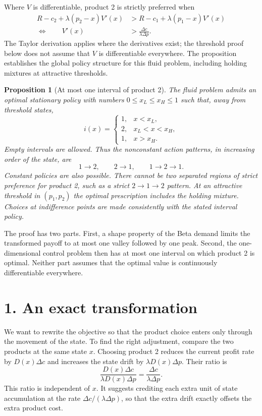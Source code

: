 \documentclass[11pt]{article}
\newtheorem{proposition}{Proposition}
\begin{document}
Where $V$ is differentiable, product 2 is strictly preferred when
\begin{align*}
R-c_2+\lambda(p_2-x)V'(x)
&>R-c_1+\lambda(p_1-x)V'(x)\\
\Longleftrightarrow\qquad V'(x)&>\frac{\Delta c}{\lambda\Delta p}.
\end{align*}
The Taylor derivation applies where the derivatives exist; the threshold
proof below does not assume that $V$ is differentiable everywhere.
The proposition establishes the global policy structure for this fluid
problem, including holding mixtures at attractive thresholds.

\begin{proposition}[At most one interval of product 2]\label{prop:fluid-band}
The fluid problem admits an optimal stationary policy with numbers
$0\le x_L\le x_H\le1$ such that, away from threshold states,
\begin{equation*}
i(x)=
\begin{cases}
1,&x<x_L,\\
2,&x_L<x<x_H,\\
1,&x>x_H.
\end{cases}
\end{equation*}
Empty intervals are allowed. Thus the nonconstant action patterns, in
increasing order of the state, are
\begin{equation*}
1\longrightarrow2,\qquad 2\longrightarrow1,\qquad
1\longrightarrow2\longrightarrow1.
\end{equation*}
Constant policies are also possible. There cannot be two separated regions
of strict preference for product 2, such as a strict $2\to1\to2$ pattern.
At an attractive threshold in $(p_1,p_2)$ the optimal prescription includes
the holding mixture. Choices at indifference points are made consistently
with the stated interval policy.
\end{proposition}

The proof has two parts. First, a shape property of the Beta demand limits
the transformed payoff to at most one valley followed by one peak. Second,
the one-dimensional control problem then has at most one interval on which
product 2 is optimal. Neither part assumes that the optimal value is
continuously differentiable everywhere.

\section*{1. An exact transformation}
We want to rewrite the objective so that the product choice enters only
through the movement of the state. To find the right adjustment, compare
the two products at the same state $x$. Choosing product 2 reduces the
current profit rate by $D(x)\Delta c$ and increases the state drift by
$\lambda D(x)\Delta p$. Their ratio is
\begin{equation*}
\frac{D(x)\Delta c}{\lambda D(x)\Delta p}
=\frac{\Delta c}{\lambda\Delta p}.
\end{equation*}
This ratio is independent of $x$. It suggests crediting each extra unit
of state accumulation at the rate $\Delta c/(\lambda\Delta p)$, so that
the extra drift exactly offsets the extra product cost.
\end{document}

